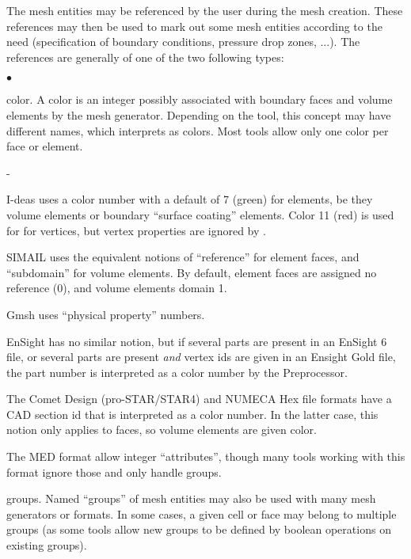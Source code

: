 {{{The mesh entities may be referenced by the user during the mesh
creation. These references may then be used to mark out some mesh entities
according to the need (specification of boundary conditions, pressure
drop zones, ...). The references are generally of one of the two
following types:
\begin{list}{$\bullet$}{}
\item color.
A color is an integer possibly associated with boundary faces and
volume elements by the mesh generator. Depending on the tool,
this concept may have different names, which \CS interprets
as colors. Most tools allow only one color per face or element.
      \begin{list}{-}{}
      \item I-deas uses a color number with a default of
            7 (green) for elements, be they volume elements or boundary
            ``surface coating'' elements. Color 11 (red) is used for
            for vertices, but vertex properties are ignored by \CS.
      \item SIMAIL uses the equivalent notions of ``reference''
            for element faces, and ``subdomain'' for volume elements.
            By default, element faces are assigned no reference (0),
            and volume elements domain 1.
      \item Gmsh uses ``physical property'' numbers.
      \item EnSight has no similar notion, but if several parts
            are present in an EnSight 6 file, or several parts
            are present \emph{and} vertex ids are given in an
            Ensight Gold file, the part number is interpreted as
            a color number by the Preprocessor.
      \item The Comet Design (pro-STAR/STAR4) and NUMECA Hex file
            formats have a CAD section id that is interpreted
            as a color number. In the latter case, this notion
            only applies to faces, so volume elements are given
            color.
      \item The MED format allow integer ``attributes'', though
            many tools working with this format ignore those
            and only handle groups.
      \end{list}
\item groups.
Named ``groups'' of mesh entities may also be used with many
mesh generators or formats. In some cases, a given cell or face may belong
to multiple groups (as some tools allow new groups to be defined
by boolean operations on existing groups).

\end{list}}}}
